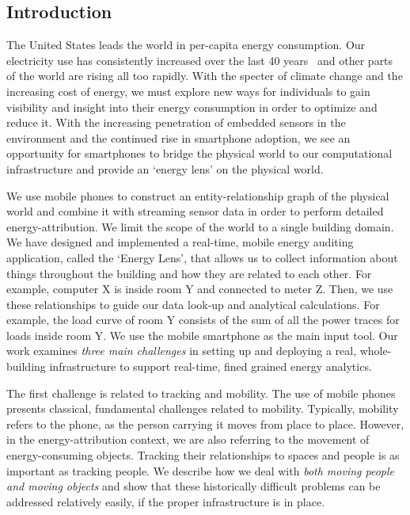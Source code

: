 \subsection{Introduction}
The United States leads the world in per-capita energy consumption.
Our electricity use has consistently increased over the last 40 years~\cite{oecd2011} and other parts of the world are rising all 
too rapidly.  With the specter of climate change and the increasing cost of energy, we must explore new
ways for individuals to gain visibility and insight into their energy consumption in order to optimize and reduce it. 
With the increasing penetration of embedded sensors in the environment and
the continued rise in smartphone adoption, we see an opportunity for smartphones to bridge the physical world
to our computational infrastructure and provide an `energy lens' on the physical world.  

We use mobile phones to construct an entity-relationship 
graph of the physical world and combine it with streaming sensor data in order to perform detailed energy-attribution.
We limit the scope of the world to a single building domain.  We have designed and implemented a real-time, mobile energy auditing
application, called the `Energy Lens', that allows us to collect information about 
things throughout the building and how they are related to each other.  For example, computer X is inside 
room Y and connected to meter Z.  Then, we use these relationships to guide our data look-up and analytical
calculations.  For example, the load curve of room Y consists of the sum of all the power traces for loads
inside room Y.  We use the mobile smartphone as the main input tool.  Our work examines \emph{three main challenges} in setting up and 
deploying a real, whole-building infrastructure to support real-time, 
fined grained energy analytics.  

The first challenge is related to tracking and mobility.
The use of mobile phones presents classical, fundamental challenges related to mobility.  Typically, mobility
refers to the phone, as the person carrying it moves from place to place.  However, in the energy-attribution
context, we are also referring to the movement of energy-consuming objects.  Tracking their relationships to spaces 
and people is as important as tracking people.  We describe how we deal with \emph{both moving people and 
moving objects} and show that these historically difficult problems can be addressed relatively easily, if the proper infrastructure is 
in place.  %


